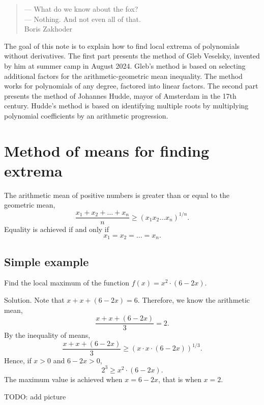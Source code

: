 \documentclass[12pt]{article}
\begin{document}
\begin{verse}
    \begin{flushright}
        — What do we know about the fox? \\
        — Nothing. And not even all of that. \\

        Boris Zakhoder
    \end{flushright}
\end{verse}

The goal of this note is to explain how to find local extrema of polynomials without derivatives.
The first part presents the method of Gleb Veselsky, invented by him at summer camp in August 2024.
Gleb's method is based on selecting additional factors for the arithmetic-geometric mean inequality.
The method works for polynomials of any degree, factored into linear factors.
The second part presents the method of Johannes Hudde, mayor of Amsterdam in the 17th century. 
Hudde's method is based on identifying multiple roots by multiplying polynomial coefficients by an arithmetic progression.


\section{Method of means for finding extrema}

\begin{tcolorbox}[colback=yellow!50!red!25!white]
The arithmetic mean of positive numbers is greater than or equal to the geometric mean,
\[
\frac{x_1 + x_2 + \dots + x_n}{n} \geq (x_1 x_2 \dots x_n)^{1/n}.
\]
Equality is achieved if and only if
\[
x_1 = x_2 = \dots = x_n.
\]
\end{tcolorbox}

\subsection*{Simple example}

Find the local maximum of the function $f(x) = x^2 \cdot (6 - 2x)$.


Solution. Note that $x + x + (6 - 2x) = 6$.
Therefore, we know the arithmetic mean,
\[
\frac{x + x + (6- 2x)}{3} = 2.
\]
By the inequality of means,
\[
\frac{x + x + (6- 2x)}{3} \geq (x\cdot x \cdot (6 - 2x))^{1/3}.
\]
Hence, if $x > 0$ and $6 - 2x>0$, 
\[
2^3 \geq x^2 \cdot (6 - 2x).
\]
The maximum value is achieved when $x = 6 - 2x$, that is when $x=2$.


TODO: add picture
\end{document}
